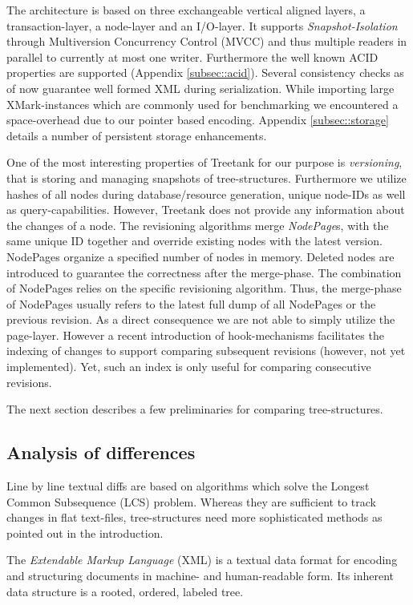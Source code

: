 The architecture is based on three exchangeable vertical aligned layers, a transaction-layer, a node-layer and an I/O-layer. It supports \emph{Snapshot-Isolation} through Multiversion Concurrency Control (MVCC) and thus multiple readers in parallel to currently at most one writer. Furthermore the well known ACID properties are supported (Appendix \ref{subsec::acid}). Several consistency checks as of now guarantee well formed XML during serialization. While importing large XMark-instances \cite{XMark} which are commonly used for benchmarking we encountered a space-overhead due to our pointer based encoding. Appendix \ref{subsec::storage} details a number of persistent storage enhancements.

One of the most interesting properties of Treetank for our purpose is \emph{versioning}, that is storing and managing snapshots of tree-structures. Furthermore we utilize hashes of all nodes during database/resource generation, unique node-IDs as well as query-capabilities. However, Treetank does not provide any information about the changes of a node. The revisioning algorithms merge \emph{NodePage}s, with the same unique ID together and override existing nodes with the latest version. NodePages organize a specified number of nodes in memory. Deleted nodes are introduced to guarantee the correctness after the merge-phase. The combination of NodePages relies on the specific revisioning algorithm. Thus, the merge-phase of NodePages usually refers to the latest full dump of all NodePages or the previous revision. As a direct consequence we are not able to simply utilize the page-layer. However a recent introduction of hook-mechanisms facilitates the indexing of changes to support comparing subsequent revisions (however, not yet implemented). Yet, such an index is only useful for comparing consecutive revisions.

The next section describes a few preliminaries for comparing tree-structures.

\subsection{Analysis of differences}
Line by line textual diffs are based on algorithms which solve the Longest Common Subsequence (LCS) problem. Whereas they are sufficient to track changes in flat text-files, tree-structures need more sophisticated methods as pointed out in the introduction.

The \emph{Extendable Markup Language} (XML) is a textual data format for encoding and structuring documents in machine- and human-readable form. Its inherent data structure is a rooted, ordered, labeled tree. 

